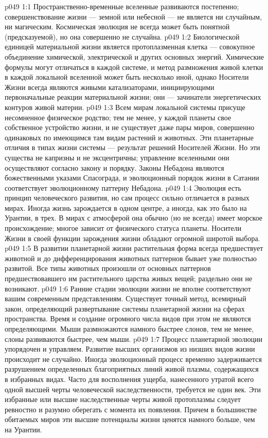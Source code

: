 \vs p049 1:1 Пространственно\hyp{}временные вселенные развиваются постепенно; совершенствование жизни --- земной или небесной --- не является ни случайным, ни магическим. Космическая эволюция не всегда может быть понятной (предсказуемой), но она совершенно не случайна.
\vs p049 1:2 Биологической единицей материальной жизни является протоплазменная клетка --- совокупное объединение химической, электрической и других основных энергий. Химические формулы могут отличаться в каждой системе, и метод размножения живой клетки в каждой локальной вселенной может быть несколько иной, однако Носители Жизни всегда являются живыми катализаторами, инициирующими первоначальные реакции материальной жизни; они --- зачинатели энергетических контуров живой материи.
\vs p049 1:3 Всем мирам локальной системы присуще несомненное физическое родство; тем не менее, у каждой планеты свое собственное устройство жизни, и не существует даже пары миров, совершенно одинаковых по имеющимся там видам растений и животных. Эти планетарные отличия в типах жизни системы --- результат решений Носителей Жизни. Но эти существа не капризны и не эксцентричны; управление вселенными они осуществляют согласно закону и порядку. Законы Небадона являются божественными указами Спасограда, и эволюционный порядок жизни в Сатании соответствует эволюционному паттерну Небадона.
\vs p049 1:4 Эволюция есть принцип человеческого развития, но сам процесс сильно отличается в разных мирах. Иногда жизнь зарождается в одном центре, а иногда, как это было на Урантии, в трех. В мирах с атмосферой она обычно (но не всегда) имеет морское происхождение; многое зависит от физического статуса планеты. Носители Жизни в своей функции зарождения жизни обладают огромной широтой выбора.
\vs p049 1:5 В развитии планетарной жизни растительная форма всегда предшествует животной и до дифференцирования животных паттернов бывает уже полностью развитой. Все типы животных произошли от основных паттернов предшествовавшего им растительного царства живых вещей; раздельно они не возникают.
\vs p049 1:6 Ранние стадии эволюции жизни не вполне соответствуют вашим современным представлениям.  Существует точный метод, всемирный закон, определяющий развертывание системы планетарной жизни на сферах пространства. Время и создание огромного числа видов при этом не являются определяющими. Мыши размножаются намного быстрее слонов, тем не менее, слоны развиваются быстрее, чем мыши.
\vs p049 1:7 Процесс планетарной эволюции упорядочен и управляем. Развитие высших организмов из низших видов жизни происходит не случайно. Иногда эволюционный процесс временно задерживается разрушением определенных благоприятных линий живой плазмы, содержащихся в избранных видах. Часто для восполнения ущерба, нанесенного утратой всего одной высшей черты человеческой наследственности, требуется не один век. Эти избранные или высшие наследственные черты живой протоплазмы следует ревностно и разумно оберегать с момента их появления. Причем в большинстве обитаемых миров эти высшие потенциалы жизни ценятся намного больше, чем на Урантии.
